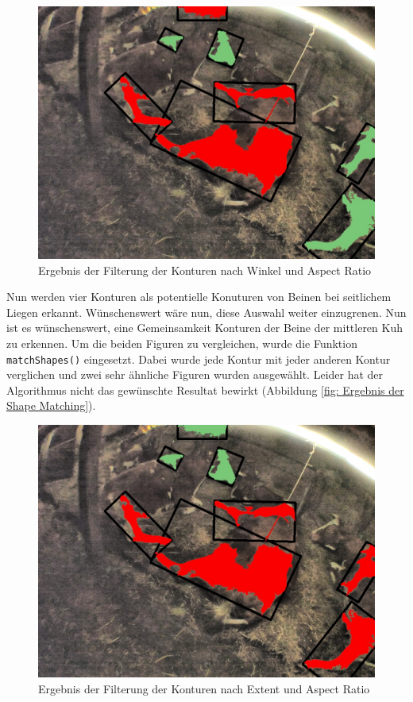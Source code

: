 \begin{figure}[H]
	\center
	\includegraphics[scale=0.43]{Grafiken/entwicklung/28FilteredAspectAndAngle.jpg}
	\caption{Ergebnis der Filterung der Konturen nach Winkel und Aspect Ratio} 
	\label{fig: Ergebnis der Filterung der Konturen nach Winkel, Extent und Aspect Ratio} 
\end{figure}

Nun werden vier Konturen als potentielle Konuturen von Beinen bei seitlichem Liegen erkannt. Wünschenswert wäre nun, diese Auswahl weiter einzugrenen. Nun ist es wünschenswert, eine Gemeinsamkeit Konturen der Beine der mittleren Kuh zu erkennen. Um die beiden Figuren zu vergleichen, wurde die Funktion \texttt{matchShapes()} eingesetzt. Dabei wurde jede Kontur mit jeder anderen Kontur verglichen und zwei sehr ähnliche Figuren wurden ausgewählt. Leider hat der Algorithmus nicht das gewünschte Resultat bewirkt (Abbildung \ref{fig: Ergebnis der Shape Matching}). 

\begin{figure}[H]
	\center
	\includegraphics[scale=0.43]{Grafiken/entwicklung/29FilteredByExtentAndAspect.jpg}
	\caption{Ergebnis der Filterung der Konturen nach Extent und Aspect Ratio} 
	\label{fig: Ergebnis der Filterung der Konturen nach Extent und Aspect Ratio} 
\end{figure}

